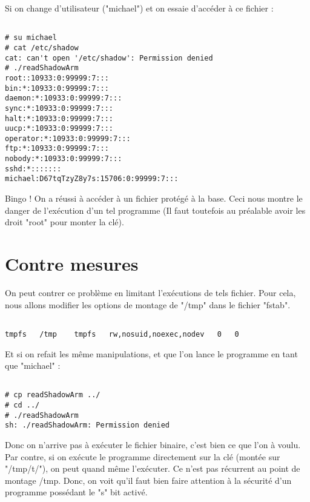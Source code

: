 Si on change d'utilisateur ("michael") et on essaie d'accéder à ce fichier :
\begin{lstlisting}[frame=single,style=Bash]  % Start your code-block

# su michael
# cat /etc/shadow
cat: can't open '/etc/shadow': Permission denied
# ./readShadowArm
root::10933:0:99999:7:::
bin:*:10933:0:99999:7:::
daemon:*:10933:0:99999:7:::
sync:*:10933:0:99999:7:::
halt:*:10933:0:99999:7:::
uucp:*:10933:0:99999:7:::
operator:*:10933:0:99999:7:::
ftp:*:10933:0:99999:7:::
nobody:*:10933:0:99999:7:::
sshd:*:::::::
michael:D67tqTzyZ8y7s:15706:0:99999:7:::

\end{lstlisting}

Bingo ! On a réussi à accéder à un fichier protégé à la base. Ceci nous montre le danger de l'exécution d'un tel programme (Il faut toutefois au préalable avoir les droit "root" pour monter la clé).

\section{Contre mesures}
On peut contrer ce problème en limitant l'exécutions de tels fichier. Pour cela, nous allons modifier les options de montage de "/tmp" dans le fichier "fstab".

\begin{lstlisting}[frame=single,style=Bash]  % Start your code-block

tmpfs   /tmp    tmpfs   rw,nosuid,noexec,nodev   0   0
\end{lstlisting}

Et si on refait les même manipulations, et que l'on lance le programme en tant que "michael" :
\begin{lstlisting}[frame=single,style=Bash]  % Start your code-block

# cp readShadowArm ../
# cd ../
# ./readShadowArm 
sh: ./readShadowArm: Permission denied
\end{lstlisting}

Donc on n'arrive pas à exécuter le fichier binaire, c'est bien ce que l'on à voulu. Par contre, si on exécute le programme directement sur la clé (montée sur "/tmp/t/"), on peut quand même l'exécuter. Ce n'est pas récurrent au point de montage /tmp. Donc, on voit qu'il faut bien faire attention à la sécurité d'un programme possédant le "s" bit activé.
